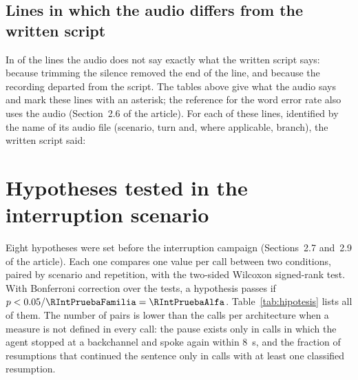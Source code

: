 \documentclass[11pt]{article}
\begin{document}
\subsection{Lines in which the audio differs from the written script}
\label{sec:correcciones}

In \RGuionCorregidas{} of the \RGuionLineas{} lines the audio does not say exactly
what the written script says: \RGuionCorregidasRecorte{} because trimming the
silence removed the end of the line, and \RGuionCorregidasDesvio{} because the
recording departed from the script. The tables above give what the audio says and
mark these lines with an asterisk; the reference for the word error rate also uses
the audio (Section~2.6 of the article). For each of these lines, identified by the
name of its audio file (scenario, turn and, where applicable, branch), the written
script said:
{\footnotesize
}


\section{Hypotheses tested in the interruption scenario}
\label{sec:hipotesis}

Eight hypotheses were set before the interruption campaign (Sections~2.7 and~2.9 of
the article). Each one compares one value per call between two conditions, paired
by scenario and repetition, with the two-sided Wilcoxon signed-rank test. With
Bonferroni correction over the \RIntPruebaFamilia{} tests, a hypothesis passes if
$p<0.05/\RIntPruebaFamilia=\RIntPruebaAlfa$. Table~\ref{tab:hipotesis} lists all of
them. The number of pairs is lower than the \RIntLlamadasA{} calls per architecture
when a measure is not defined in every call: the pause exists only in calls in
which the agent stopped at a backchannel and spoke again within 8~s, and the
fraction of resumptions that continued the sentence only in calls with at least one
classified resumption.
\end{document}
